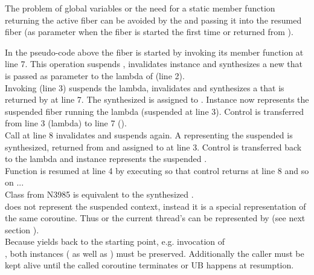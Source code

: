 \label{solution_gpub}


\label{synthesizing}
The problem of global variables or the need for a static member function
returning the active fiber can be avoided by  the
 and passing it into the resumed fiber (as parameter when the
fiber is started the first time or returned from \resume).

In the pseudo-code above the fiber  is started by invoking its member
function \resume at line 7. This operation suspends , invalidates
instance  and synthesizes a new \fiber\xspace {} that is passed as parameter
to the lambda of  (line 2).\\
Invoking  (line 3) suspends the lambda, invalidates  and
synthesizes a \fiber that is returned by  at line 7. The
synthesized \fiber is assigned to . Instance  now represents the
suspended fiber running the lambda (suspended at line 3). Control is
transferred from line 3 (lambda) to line 7 ().\\
Call  at line 8 invalidates  and suspends 
again. A \fiber representing the suspended  is synthesized, returned
from  and assigned to  at line 3. Control
is transferred back to the lambda and instance  represents the suspended
.\\
Function  is resumed at line 4 by executing  so that
control returns at line 8 and so on ...\\

Class  from N3985\cite{N3985} is
 equivalent to the synthesized \fiber.\\
 does not represent the suspended context,
instead it is a special representation of the same coroutine. Thus \main or
the current thread's \entryfn\xspace can  be represented by 
(see next section ).\\
Because  yields back to the starting
point, e.g. invocation of\\
,
both instances ( as well as ) must be preserved.
Additionally the caller must be kept alive until the called coroutine terminates
or UB happens at resumption.\\

